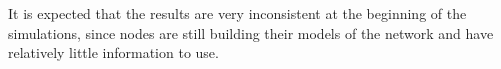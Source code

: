 It is expected that the results are very inconsistent at the beginning of the simulations, since nodes are still building their models of the network and have relatively little information to use.


%
%
%

%

%
%	
%
%
%	



%

